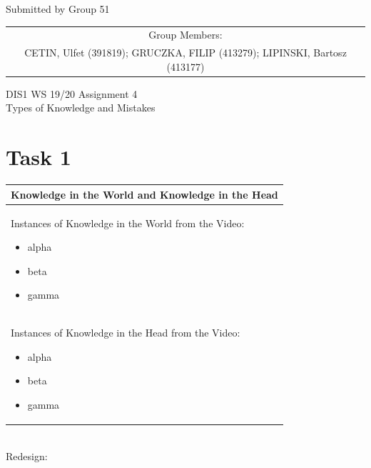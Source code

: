 \documentclass[a4paper,11pt,oneside]{scrreprt}
\begin{document}
\begin{center}
	Submitted by Group 51
	
	\bigskip
	
	\begin{tabular}{c}
	Group Members: \\
	CETIN, Ulfet (391819); GRUCZKA, FILIP (413279);	LIPINSKI, Bartosz (413177) \\
	\end{tabular}

	\bigskip
	
	DIS1 WS 19/20 Assignment 4\\
	Types of Knowledge and Mistakes
	
\end{center}

\section*{Task 1}

\begin{tabularx}{\textwidth}{|X|}
	\hline
	\textbf{Knowledge in the World and Knowledge in the Head}\\
	\hline
	Instances of Knowledge in the World from the Video:
	
	\begin{itemize}
		\item alpha 
		\item beta
		\item gamma
	\end{itemize}

	\\
	\hline
	Instances of Knowledge in the Head from the Video:
	
	\begin{itemize}
		\item alpha 
		\item beta
		\item gamma
	\end{itemize}
	
	\\
	\hline
	
\end{tabularx}\\

	Redesign:\\
	
\end{document}
